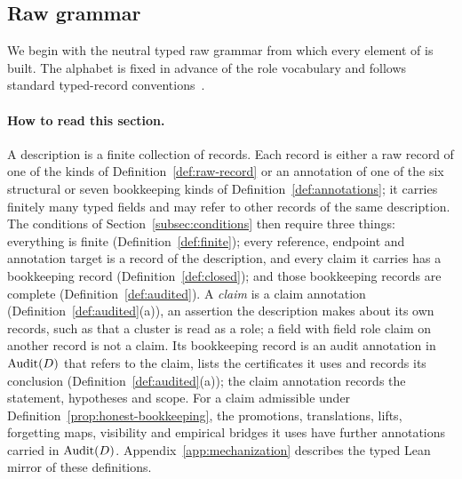 \subsection{Raw grammar}\label{subsec:raw-grammar}

We begin with the neutral typed raw grammar from which every element
of \FATCD{} is built. The alphabet is fixed in advance of the role
vocabulary and follows standard typed-record
conventions~\citep{CardelliMitchell1991}.

\paragraph{How to read this section.} A description is a finite collection of
records. Each record is either a raw record of one of the kinds of
Definition~\ref{def:raw-record} or an annotation of one of the six structural or seven bookkeeping kinds
of Definition~\ref{def:annotations}; it carries finitely many typed fields
and may refer to other records of the same description. The conditions
of Section~\ref{subsec:conditions} then require three things: everything
is finite (Definition~\ref{def:finite}); every reference, endpoint and
annotation target is a record of the description, and every claim it
carries has a bookkeeping record (Definition~\ref{def:closed}); and those
bookkeeping records are complete (Definition~\ref{def:audited}). A
\emph{claim} is a claim annotation (Definition~\ref{def:audited}(a)), an assertion the description makes about its own
records, such as that a cluster is read as a role; a field with field role claim on another record is not a claim. Its bookkeeping record
is an audit annotation in \(\operatorname{Audit}\!\left(D\right)\) that refers to the claim, lists
the certificates it uses and records its conclusion
(Definition~\ref{def:audited}(a)); the claim annotation records the
statement, hypotheses and scope. For a claim admissible under
Definition~\ref{prop:honest-bookkeeping}, the promotions, translations,
lifts, forgetting maps, visibility and empirical bridges it uses have further
annotations carried in \(\operatorname{Audit}\!\left(D\right)\). Appendix~\ref{app:mechanization}
describes the typed Lean mirror of these definitions.


